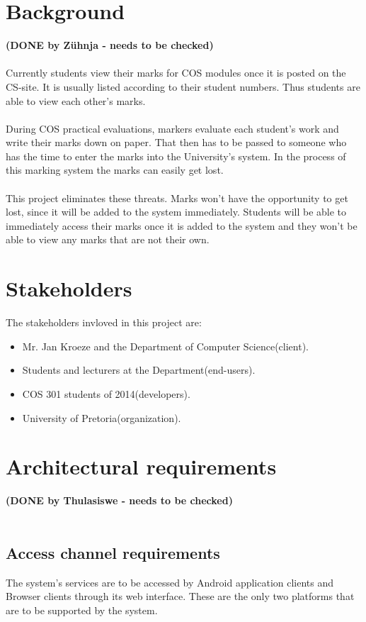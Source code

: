 \documentclass[11pt,a4paper]{article}
\begin{document}
\section{Background}
\textbf{(DONE by Z\"uhnja - needs to be checked)}\\ \\
Currently students view their marks for COS modules once it is posted on the CS-site.  It is usually listed according to their student numbers.  Thus students are able to view each other\textquoteright s marks.  \\ \\
During COS practical evaluations, markers evaluate each student\textquoteright s work and write their marks down on paper.  That then has to be passed to someone who has the time to enter the marks into the University\textquoteright s system.  In the process of this marking system the marks can easily get lost. \\ \\
This project eliminates these threats.  Marks won\textquoteright t have the opportunity to get lost, since it will be added to the system immediately. Students will be able to immediately access their marks once it is added to the system and they won\textquoteright t be able to view any marks that are not their own. 

\section{Stakeholders}
The stakeholders invloved in this project are: 
\begin{itemize}
\item Mr. Jan Kroeze and the Department of Computer Science(client). 
\item Students and lecturers at the Department(end-users).
\item COS 301 students of 2014(developers).
\item University of Pretoria(organization). 
\end{itemize}

\section{Architectural requirements}
\textbf{(DONE by Thulasiswe - needs to be checked)}\\ \\
\subsection{Access channel requirements}
The system's services are to be accessed by Android application clients and Browser clients through its web interface. These are the only two platforms that are to be supported by the system.
\end{document}
